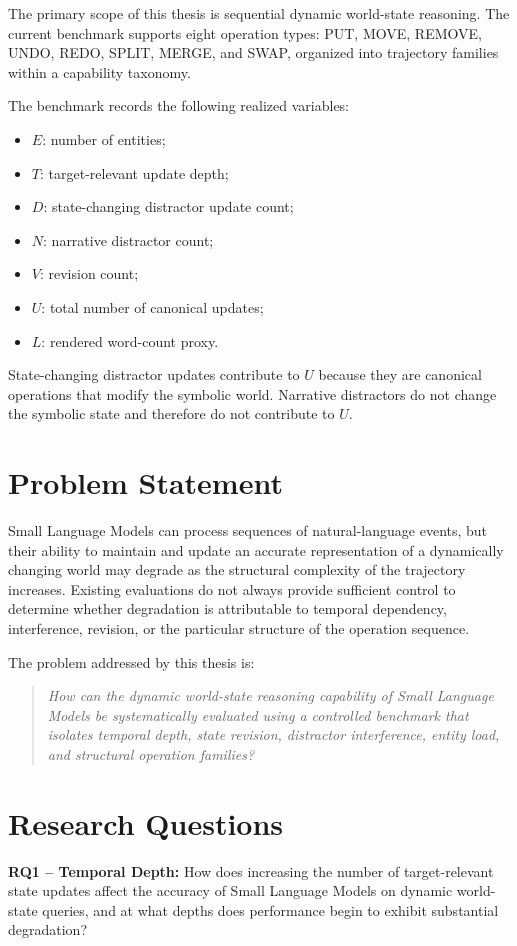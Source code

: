 \documentclass{iutbscthesis}
\begin{document}
The primary scope of this thesis is sequential dynamic world-state reasoning. The current benchmark
supports eight operation types: PUT, MOVE, REMOVE, UNDO, REDO, SPLIT, MERGE, and SWAP, organized
into trajectory families within a capability taxonomy.

The benchmark records the following realized variables:
\begin{itemize}
\item $E$: number of entities;
\item $T$: target-relevant update depth;
\item $D$: state-changing distractor update count;
\item $N$: narrative distractor count;
\item $V$: revision count;
\item $U$: total number of canonical updates;
\item $L$: rendered word-count proxy.
\end{itemize}

State-changing distractor updates contribute to $U$ because they are canonical operations that modify
the symbolic world. Narrative distractors do not change the symbolic state and therefore do not
contribute to $U$.

\section{Problem Statement}
Small Language Models can process sequences of natural-language events, but their ability to maintain
and update an accurate representation of a dynamically changing world may degrade as the structural
complexity of the trajectory increases. Existing evaluations do not always provide sufficient control
to determine whether degradation is attributable to temporal dependency, interference, revision, or
the particular structure of the operation sequence.

The problem addressed by this thesis is:
\begin{quote}
\textit{How can the dynamic world-state reasoning capability of Small Language Models be systematically
evaluated using a controlled benchmark that isolates temporal depth, state revision, distractor
interference, entity load, and structural operation families?}
\end{quote}

\section{Research Questions}
\textbf{RQ1 -- Temporal Depth:}
How does increasing the number of target-relevant state updates affect the accuracy of Small Language
Models on dynamic world-state queries, and at what depths does performance begin to exhibit substantial
degradation?
\end{document}
